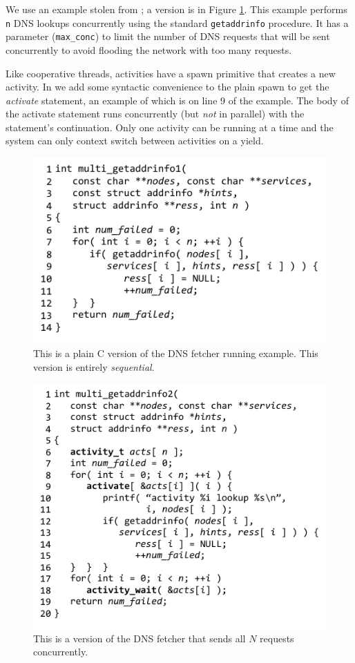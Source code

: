 \documentclass[9pt,preprint]{sigplanconf}
\begin{document}
We use an example stolen from \cite{Krohn2007}; a \charcoal{} version is in Figure \ref{fig:charcoal_multidns_seq}.
This example performs \texttt{n} DNS lookups concurrently using the standard \texttt{getaddrinfo} procedure.
It has a parameter (\texttt{max\_conc}) to limit the number of DNS requests that will be sent concurrently to avoid flooding the network with too many requests.

Like cooperative threads, activities have a spawn primitive that creates a new activity.
In \charcoal{} we add some syntactic convenience to the plain spawn to get the \emph{activate} statement, an example of which is on line 9 of the example.
The body of the activate statement runs concurrently (but \emph{not} in parallel) with the statement's continuation.
Only one activity can be running at a time and the system can only context switch between activities on a yield.

\begin{figure}
\includegraphics{multi_getaddrinfo_seq}
\caption{This is a plain C version of the DNS fetcher running example.
  This version is entirely \emph{sequential}.}
\label{fig:charcoal_multidns_seq}
\end{figure}

\begin{figure}
\includegraphics{multi_getaddrinfo_conc}
\caption{This is a \charcoal{} version of the DNS fetcher that sends all $N$ requests concurrently.}
\label{fig:charcoal_multidns_conc}
\end{figure}
\end{document}
